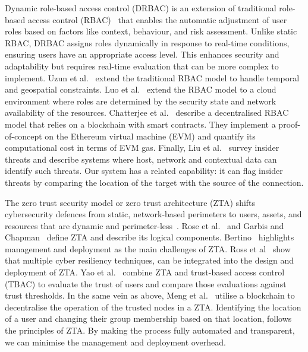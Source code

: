 Dynamic role-based access control (DRBAC) is an extension of
traditional role-based access control
(RBAC)~\cite{franqueira-wieringa-12} that enables the automatic
adjustment of user roles based on factors like context, behaviour, and
risk assessment.  Unlike static RBAC, DRBAC assigns roles dynamically
in response to real-time conditions, ensuring users have an
appropriate access level.  This enhances security and adaptability but
requires real-time evaluation that can be more complex to implement.
Uzun et al.~\cite{uzun-et-al-12} extend the traditional RBAC model to
handle temporal and geospatial constraints.  Luo et
al.~\cite{luo-et-al-16} extend the RBAC model to a cloud environment
where roles are determined by the security state and network
availability of the resources.  Chatterjee et
al.~\cite{chatterjee-et-al-20} describe a decentralised RBAC model
that relies on a blockchain with smart contracts.  They implement a
proof-of-concept on the Ethereum virtual machine (EVM) and quantify
its computational cost in terms of EVM gas.  Finally, Liu et
al.~\cite{liu-et-al-18} survey insider threats and describe systems
where host, network and contextual data can identify such threats.
Our system has a related capability: it can flag insider threats by
comparing the location of the target with the source of the
connection.

The zero trust security model or zero trust architecture (ZTA) shifts
cybersecurity defences from static, network-based perimeters to users,
assets, and resources that are dynamic and
perimeter-less~\cite{syed-et-al-22}.  Rose et al.~\cite{rose-et-al-20}
and Garbis and Chapman~\cite{garbis-chapman-21} define ZTA and
describe its logical components.  Bertino~\cite{bertino-21} highlights
management and deployment as the main challenges of ZTA.  Ross et
al~\cite{ross-et-al-21} show that multiple cyber resiliency
techniques, can be integrated into the design and deployment of ZTA.
Yao et al.~\cite{yao-et-al-21} combine ZTA and trust-based access
control (TBAC) to evaluate the trust of users and compare those
evaluations against trust thresholds.  In the same vein as above, Meng
et al.~\cite{meng-et-al-22} utilise a blockchain to decentralise the
operation of the trusted nodes in a ZTA.  Identifying the location of
a user and changing their group membership based on that location,
follows the principles of ZTA.  By making the process fully automated
and transparent, we can minimise the management and deployment
overhead.
